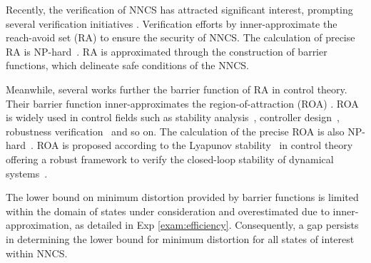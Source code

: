 \documentclass[conference]{IEEEtran}
\newcommand{\nncs}{\textsc{NNCS}\xspace}
\newcommand{\roa}{\textsc{ROA}\xspace}
\newcommand{\ra}{\textsc{RA}\xspace}
\newcommand{\myvec}[1]{\boldsymbol{#1}}
\begin{document}
Recently, the verification of 
\nncs has attracted 
significant interest, prompting 
several verification initiatives 
\cite{ivanov2021verisig,huang2022polar,sha2021synthesizing}. 
Verification efforts by 
\cite{xue2020inner,xue2021reach,zhang2023reachability} 
inner-approximate the reach-avoid set (\ra) to ensure the 
security of \nncs. The calculation of precise 
\ra is NP-hard~\cite{xue2020inner}. 
\ra is approximated through the 
construction of barrier functions, which 
delineate safe conditions of the \nncs. 

Meanwhile, several works 
further the barrier function of \ra 
in control theory. 
Their barrier function 
inner-approximates the region-of-attraction (\roa) 
\cite{dai2021lyapunov,wu2023neural,yanglyapunov}. 
\roa is widely used in control fields such as 
stability analysis~\cite{chakraborty2011nonlinear,chen2014stability}, 
controller design~\cite{korda2014controller,mauroy2016global}, 
robustness verification~\cite{wu2023neural,yanglyapunov} and so on.
The calculation of the 
precise \roa 
is also NP-hard~\cite{dai2021lyapunov}. 
\roa is proposed according to the 
Lyapunov stability~\cite{lyapunov1992general} in control theory 
offering a robust framework to verify the closed-loop 
stability of dynamical systems~\cite{yanglyapunov}. 

The lower bound on minimum distortion 
provided by barrier functions is 
limited within the domain of states 
under consideration and 
overestimated due to inner-approximation, 
as detailed in Exp \ref{exam:efficiency}. 
Consequently, a gap persists 
in determining the lower bound for minimum 
distortion for all states of interest within \nncs.

\end{document}
